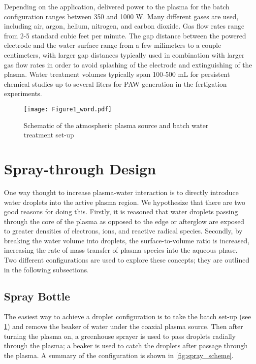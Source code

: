 Depending on the application, delivered power to the plasma for the batch configuration ranges between 350 and 1000 W. Many different gases are used, including air, argon, helium, nitrogen, and carbon dioxide. Gas flow rates range from 2-5 standard cubic feet per minute. The gap distance between the powered electrode and the water surface range from a few milimeters to a couple centimeters, with larger gap distances typically used in combination with larger gas flow rates in order to avoid splashing of the electrode and extinguishing of the plasma. Water treatment volumes typically span 100-500 mL for persistent chemical studies up to several liters for PAW generation in the fertigation experiments.

\begin{figure}[htbp]
  \centering
  \texttt{[image: Figure1\_word.pdf]}
  \caption{Schematic of the atmospheric plasma source and batch water treatment set-up}
  \label{fig:batch_scheme}
\end{figure}

\section{Spray-through Design}
\label{sec:spray}

One way thought to increase plasma-water interaction is to directly introduce water droplets into the active plasma region. We hypothesize that there are two good reasons for doing this. Firstly, it is reasoned that water droplets passing through the core of the plasma as opposed to the edge or afterglow are exposed to greater densities of electrons, ions, and reactive radical species. Secondly, by breaking the water volume into droplets, the surface-to-volume ratio is increased, increasing the rate of mass transfer of plasma species into the aqueous phase. Two different configurations are used to explore these concepts; they are outlined in the following subsections.

\subsection{Spray Bottle}
\label{sec:spray_bottle}

The easiest way to achieve a droplet configuration is to take the batch set-up (see \cref{fig:batch_scheme}) and remove the beaker of water under the coaxial plasma source. Then after turning the plasma on, a greenhouse sprayer is used to pass droplets radially through the plasma; a beaker is used to catch the droplets after passage through the plasma. A summary of the configuration is shown in \cref{fig:spray_scheme}.

